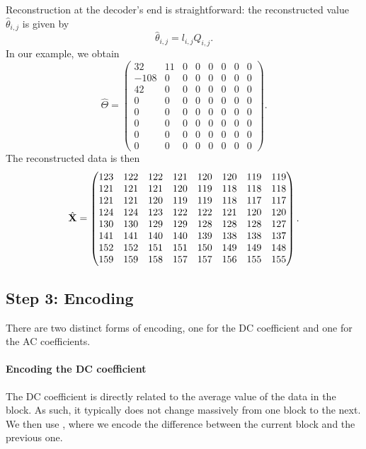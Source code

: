 \documentclass[a4paper, 11pt, openany]{book}
\begin{document}
Reconstruction at the decoder's end is straightforward: the reconstructed value $\hat{\theta}_{i,j}$ is given by
\[
    \hat{\theta}_{i,j} = l_{i,j} Q_{i,j}.
\]
In our example, we obtain
\[
    \hat{\Theta} = \begin{pmatrix}
    32 & 11 & 0 & 0 & 0 & 0 & 0 & 0\\
    -108 & 0 & 0 & 0 & 0 & 0 & 0 & 0\\
    42 & 0 & 0 & 0 & 0 & 0 & 0 & 0\\
    0 & 0 & 0 & 0 & 0 & 0 & 0 & 0\\
    0 & 0 & 0 & 0 & 0 & 0 & 0 & 0\\
    0 & 0 & 0 & 0 & 0 & 0 & 0 & 0\\
    0 & 0 & 0 & 0 & 0 & 0 & 0 & 0\\
    0 & 0 & 0 & 0 & 0 & 0 & 0 & 0
    \end{pmatrix}.
\]
The reconstructed data is then
\[
    \hat{\bf X} = \begin{pmatrix}
    123 & 122 & 122 & 121 & 120 & 120 & 119 & 119\\
    121 & 121 & 121 & 120 & 119 & 118 & 118 & 118\\
    121 & 121 & 120 & 119 & 119 & 118 & 117 & 117\\
    124 & 124 & 123 & 122 & 122 & 121 & 120 & 120\\
    130 & 130 & 129 & 129 & 128 & 128 & 128 & 127\\
    141 & 141 & 140 & 140 & 139 & 138 & 138 & 137\\
    152 & 152 & 151 & 151 & 150 & 149 & 149 & 148\\
    159 & 159 & 158 & 157 & 157 & 156 & 155 & 155
    \end{pmatrix}.
\]

\subsection{Step 3: Encoding}

There are two distinct forms of encoding, one for the DC coefficient and one for the AC coefficients.

\paragraph{Encoding the DC coefficient}
The DC coefficient is directly related to the average value of the data in the block. As such, it typically does not change massively from one block to the next. We then use , where we encode the difference between the current block and the previous one.
\end{document}
